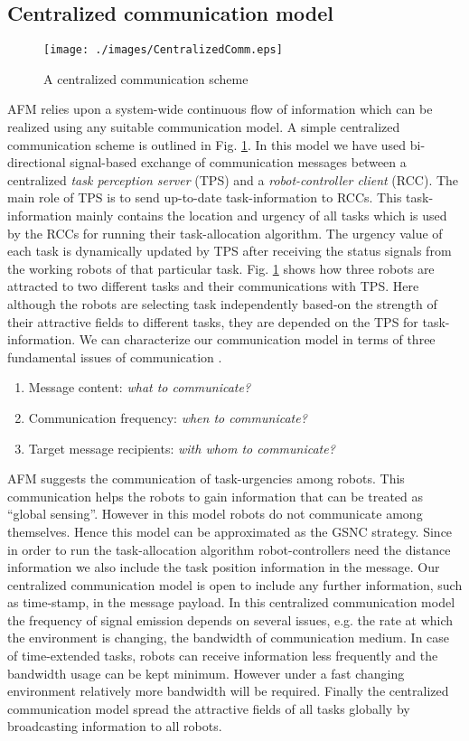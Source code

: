 \documentclass{intech}
\begin{document}
\subsection{Centralized communication model}
\begin{figure}
\centering
\texttt{[image: ./images/CentralizedComm.eps]}
\caption{\small A centralized communication scheme} %
\label{fig:ccm} %
\end{figure}
AFM relies upon a system-wide continuous flow of information which can be realized using any suitable communication model. A simple centralized communication scheme is outlined in Fig. \ref{fig:ccm}. In this model we have used bi-directional signal-based exchange of communication messages between a centralized \textit{task perception server} (TPS) and a \textit{robot-controller client} (RCC). The main role of TPS is to send up-to-date task-information to RCCs. This  task-information mainly contains the location and urgency of all tasks  which is used by the RCCs for running their task-allocation algorithm. The urgency value of each task is dynamically updated  by TPS after receiving the  status signals from the working robots of that particular task. Fig. \ref{fig:ccm} shows how three robots are attracted to two different tasks and their communications with TPS. Here although the robots are selecting task independently based-on the strength of their attractive fields to different tasks, they are depended on the TPS for task-information.
We can characterize our communication model in terms of three fundamental issues of communication \cite{Gerkey+2001}. 
\begin{enumerate}
\item Message content: {\em what to communicate?}
\item Communication frequency: {\em when to communicate?}
\item Target message recipients: {\em with whom to communicate?}
\end{enumerate}
AFM suggests the communication of task-urgencies  among robots. This communication helps the robots to gain information that can be  treated as ``global sensing''. However in this model  robots do not communicate among themselves. Hence this model can be approximated as the GSNC strategy. Since in order to run the task-allocation algorithm robot-controllers need the distance information we also include the task position information in  the message. Our centralized communication model is open to include any further information, such as time-stamp, in the message payload. In this centralized communication model the frequency of signal emission depends on several issues, e.g. the rate at which the environment is changing, the bandwidth of communication medium. In case of time-extended tasks, robots can receive information less frequently and the  bandwidth usage can be kept  minimum. However under a fast changing environment relatively more bandwidth will be required.  Finally the centralized communication model spread the attractive fields of all tasks globally by broadcasting information to all robots.  
\end{document}
